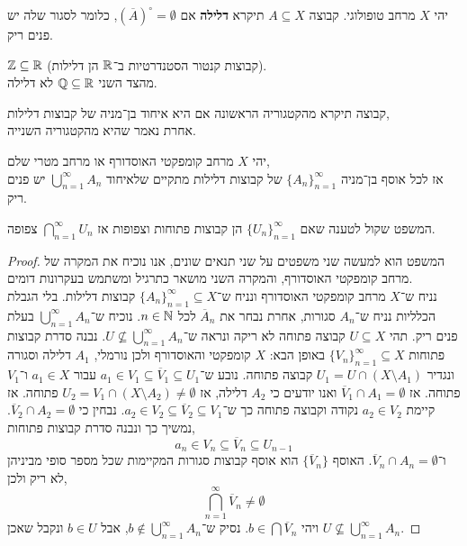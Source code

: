 \begin{definition}
	יהי $X$ מרחב טופולוגי.
	קבוצה $A \subseteq X$ תיקרא \textbf{דלילה} אם ${(\overline{A})}^\circ = \emptyset$, כלומר לסגור שלה יש פנים ריק.
\end{definition}
\begin{example}
	$\mathbb{Z} \subseteq \mathbb{R}$ (קבוצות קנטור הסטנדרטיות ב־$\mathbb{R}$ הן דלילות). \\
	מהצד השני $\mathbb{Q} \subseteq \mathbb{R}$ לא דלילה.
\end{example}
\begin{definition}
	קבוצה תיקרא מהקטגוריה הראשונה אם היא איחוד בן־מניה של קבוצות דלילות, \\
	אחרת נאמר שהיא מהקטגוריה השנייה.
\end{definition}
\begin{theorem}[בייר]
	יהי $X$ מרחב קומפקטי האוסדורף או מרחב מטרי שלם, \\
	אז לכל אוסף בן־מניה ${\{ A_n \}}_{n = 1}^\infty$ של קבוצות דלילות מתקיים שלאיחוד $\bigcup_{n = 1}^\infty A_n$ יש פנים ריק.
\end{theorem}
\begin{remark}
	המשפט שקול לטענה שאם ${\{ U_n \}}_{n = 1}^\infty$ הן קבוצות פתוחות וצפופות אז $\bigcap_{n = 1}^\infty U_n$ צפופה.
\end{remark}
\begin{proof}
	המשפט הוא למעשה שני משפטים על שני תנאים שונים, אנו נוכיח את המקרה של מרחב קומפקטי האוסדורף, והמקרה השני מושאר כתרגיל ומשתמש בעקרונות דומים. \\
	נניח ש־$X$ מרחב קומפקטי האוסדורף ונניח ש־${\{ A_n \}}_{n = 1}^\infty \subseteq X$ קבוצות דלילות.
	בלי הגבלת הכלליות נניח ש־$A_n$ סגורות, אחרת נבחר את $\overline{A}_n$ לכל $n \in \mathbb{N}$.
	נוכיח ש־$\bigcup_{n = 1}^\infty A_n$ בעלת פנים ריק.
	תהי $U \subseteq X$ קבוצה פתוחה לא ריקה ונראה ש־$U \not\subseteq \bigcup_{n = 1}^\infty A_n$.
	נבנה סדרת קבוצות פתוחות ${\{ V_n \}}_{n = 1}^\infty \subseteq X$ באופן הבא:
	$X$ קומפקטי והאוסדורף ולכן נורמלי, $A_1$ דלילה וסגורה ונגדיר $U_1 = U \cap (X \setminus A_1)$ קבוצה פתוחה.
	נובע ש־$a_1 \in V_1 \subseteq \overline{V}_1 \subseteq U_1$ עבור $a_1 \in X$ ו־$V_1$ פתוחה.
	אז $\overline{V}_1 \cap A_1 = \emptyset$ ואנו יודעים כי $A_2$ דלילה, אז $U_2 = V_1 \cap (X \setminus A_2) \ne \emptyset$ פתוחה.
	אז קיימת $a_2 \in V_2$ נקודה וקבוצה פתוחה כך ש־$a_2 \in V_2 \subseteq \overline{V}_2 \subseteq V_1$.
	נבחין כי $\overline{V}_2 \cap A_2 = \emptyset$.
	נמשיך כך ונבנה סדרת קבוצות פתוחות,
	\[
		a_n \in V_n \subseteq \overline{V}_n \subseteq U_{n - 1}
	\]
	ו־$\overline{V}_n \cap A_n = \emptyset$.
	האוסף $\{ \overline{V}_n \}$ הוא אוסף קבוצות סגורות המקיימות שכל מספר סופי מביניהן לא ריק ולכן,
	\[
		\bigcap_{n = 1}^\infty \overline{V}_n \ne \emptyset
	\]
	ויהי $b \in \bigcap \overline{V}_n$.
	נסיק ש־$b \notin \bigcup_{n = 1}^\infty A_n$, אבל $b \in U$ ונקבל שאכן $U \not\subseteq \bigcup_{n = 1}^\infty A_n$.
\end{proof}
